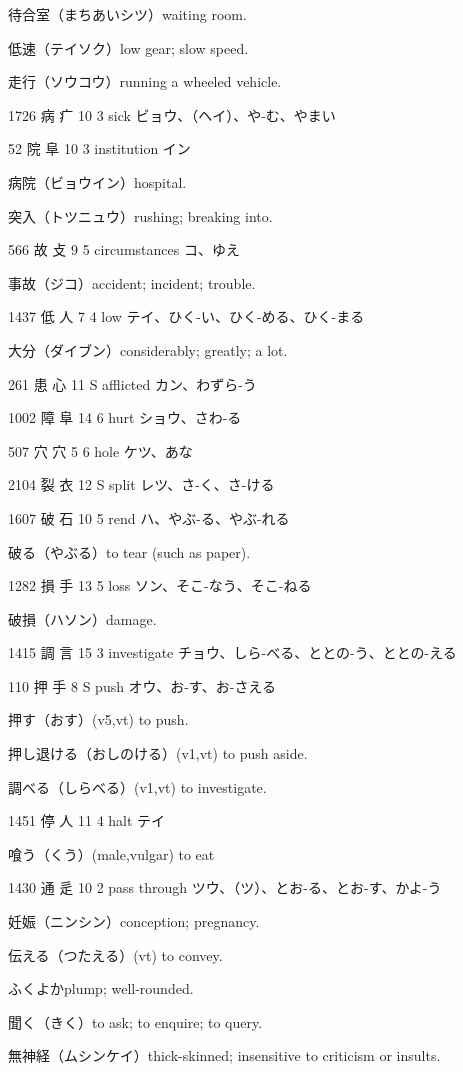 待合室（まちあいシツ）waiting room.

低速（テイソク）low gear; slow speed.

走行（ソウコウ）running a wheeled vehicle.

1726	病		疒	10	3		sick	ビョウ、（ヘイ）、や-む、やまい

52	院		阜	10	3		institution	イン

病院（ビョウイン）hospital.

突入（トツニュウ）rushing; breaking into.

566	故		攴	9	5		circumstances	コ、ゆえ

事故（ジコ）accident; incident; trouble.

1437	低		人	7	4		low	テイ、ひく-い、ひく-める、ひく-まる

大分（ダイブン）considerably; greatly; a lot.

261	患		心	11	S		afflicted	カン、わずら-う

1002	障		阜	14	6		hurt	ショウ、さわ-る

507	穴		穴	5	6		hole	ケツ、あな

2104	裂		衣	12	S		split	レツ、さ-く、さ-ける

1607	破		石	10	5		rend	ハ、やぶ-る、やぶ-れる

破る（やぶる）to tear (such as paper).

1282	損		手	13	5		loss	ソン、そこ-なう、そこ-ねる

破損（ハソン）damage.

1415	調		言	15	3		investigate	チョウ、しら-べる、ととの-う、ととの-える

110	押		手	8	S		push	オウ、お-す、お-さえる

押す（おす）(v5,vt) to push.

押し退ける（おしのける）(v1,vt) to push aside.

調べる（しらべる）(v1,vt) to investigate.

1451	停		人	11	4		halt	テイ

喰う（くう）(male,vulgar) to eat

1430	通		辵	10	2		pass through	ツウ、（ツ）、とお-る、とお-す、かよ-う

妊娠（ニンシン）conception; pregnancy.

伝える（つたえる）(vt) to convey.

ふくよかplump; well-rounded.

聞く（きく）to ask; to enquire; to query.

無神経（ムシンケイ）thick-skinned; insensitive to criticism or insults.

